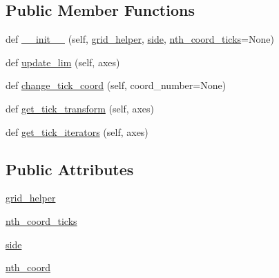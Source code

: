 \subsection*{Public Member Functions}
\begin{DoxyCompactItemize}
\item 
def \hyperlink{classaxisartist_1_1grid__helper__curvelinear_1_1FixedAxisArtistHelper_af4207225dfa7265fab5278923b2f9e6f}{\+\_\+\+\_\+init\+\_\+\+\_\+} (self, \hyperlink{classaxisartist_1_1grid__helper__curvelinear_1_1FixedAxisArtistHelper_a837096429dbda3a478f4ab7a2ee71eb9}{grid\+\_\+helper}, \hyperlink{classaxisartist_1_1grid__helper__curvelinear_1_1FixedAxisArtistHelper_a993729176beb8e77751ac53bd1ef38b4}{side}, \hyperlink{classaxisartist_1_1grid__helper__curvelinear_1_1FixedAxisArtistHelper_a443c89f52efa2ea9e370fa3165c2c488}{nth\+\_\+coord\+\_\+ticks}=None)
\item 
def \hyperlink{classaxisartist_1_1grid__helper__curvelinear_1_1FixedAxisArtistHelper_a2e5e1ca0509e65b92b43fa2f86d71af5}{update\+\_\+lim} (self, axes)
\item 
def \hyperlink{classaxisartist_1_1grid__helper__curvelinear_1_1FixedAxisArtistHelper_a9da7b275b0490dcd325fd78233a2e593}{change\+\_\+tick\+\_\+coord} (self, coord\+\_\+number=None)
\item 
def \hyperlink{classaxisartist_1_1grid__helper__curvelinear_1_1FixedAxisArtistHelper_a9f36c6b29fa4e00aca5f122e8bfce2fc}{get\+\_\+tick\+\_\+transform} (self, axes)
\item 
def \hyperlink{classaxisartist_1_1grid__helper__curvelinear_1_1FixedAxisArtistHelper_af7434d958c8e6b96b0e43c6d963d36f6}{get\+\_\+tick\+\_\+iterators} (self, axes)
\end{DoxyCompactItemize}
\subsection*{Public Attributes}
\begin{DoxyCompactItemize}
\item 
\hyperlink{classaxisartist_1_1grid__helper__curvelinear_1_1FixedAxisArtistHelper_a837096429dbda3a478f4ab7a2ee71eb9}{grid\+\_\+helper}
\item 
\hyperlink{classaxisartist_1_1grid__helper__curvelinear_1_1FixedAxisArtistHelper_a443c89f52efa2ea9e370fa3165c2c488}{nth\+\_\+coord\+\_\+ticks}
\item 
\hyperlink{classaxisartist_1_1grid__helper__curvelinear_1_1FixedAxisArtistHelper_a993729176beb8e77751ac53bd1ef38b4}{side}
\item 
\hyperlink{classaxisartist_1_1grid__helper__curvelinear_1_1FixedAxisArtistHelper_a645626ef9b3c30c5d4afce9737a16b25}{nth\+\_\+coord}
\end{DoxyCompactItemize}
